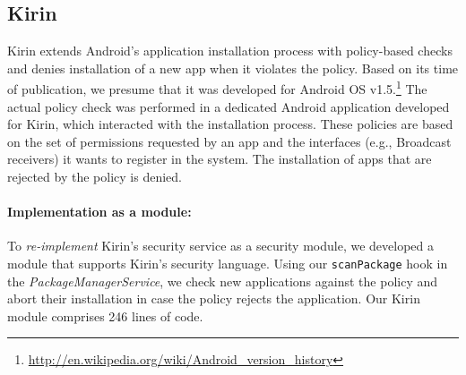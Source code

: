 \documentclass[letterpaper,twocolumn,10pt]{article}
\begin{document}
\subsection{Kirin~\cite{EnOnMc_09:Kirin}}

Kirin extends Android's application installation process with policy-based checks and denies installation of a new app when it violates the policy. Based on its time of publication, we presume that it was developed for Android OS v1.5.\footnote{\url{http://en.wikipedia.org/wiki/Android_version_history}} The actual policy check was performed in a dedicated Android application developed for Kirin, which interacted with the installation process. These policies are based on the set of permissions requested by an app and the interfaces (e.g., Broadcast receivers) it wants to register in the system. The installation of apps that are rejected by the policy is denied.

\paragraph{Implementation as a module:} To \textit{re-implement} Kirin's security service as a security module, we developed a module that supports Kirin's security language. Using our \texttt{scanPackage} hook in the \textit{PackageManagerService}, we check new applications against the policy and abort their installation in case the policy rejects the application. Our Kirin module comprises 246 lines of code.
\end{document}
